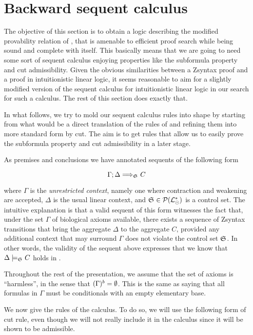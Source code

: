 \section{Backward sequent calculus}

The objective of this section is to obtain a logic describing the modified
provability relation of \eznd{}, that is amenable to efficient proof search
while being sound and complete with \eznd{} itself. This basically means that we
are going to need some sort of sequent calculus enjoying properties like the
subformula property and cut admissibility.  Given the obvious similarities
between a Zsyntax proof and a proof in intuitionistic linear logic, it seems
reasonable to aim for a slightly modified version of the sequent calculus for
intuitionistic linear logic in our search for such a calculus. The rest of this
section does exactly that.

In what follows, we try to mold our sequent calculus rules into shape by
starting from what would be a direct translation of the rules of \eznd{} and
refining them into more standard form by cut. The aim is to get rules that
allow us to easily prove the subformula property and cut admissibility in a
later stage.

As premises and conclusions we have annotated sequents of the following form

\[
  \Gamma ; \Delta \Longrightarrow_{\mathfrak{S}_{}} C
\]

where $\Gamma$ is the \emph{unrestricted context}, namely one where contraction
and weakening are accepted, $\Delta$ is the usual linear context, and
$\mathfrak{S}_{} \in \mathcal{P}(\mathcal{L}_{\odot}^*)$ is a control set. The intuitive
explanation is that a valid sequent of this form witnesses the fact that, under
the set $\Gamma$ of biological axioms available, there exists a sequence of
Zsyntax transitions that bring the aggregate $\Delta$ to the aggregate $C$,
provided any additional context that may surround $\Gamma$ does not violate the
control set $\mathfrak{S}_{}$. In other words, the validity of the sequent above
expresses that we know that $\Delta \models_{\mathfrak{S}_{}} C$ holds in \eznd{}.

Throughout the rest of the presentation, we assume that the set of axioms is
``harmless'', in the sense that $(\Gamma)^{b} = \emptyset$.
This is the same as saying that all formulas in $\Gamma$ must be conditionals
with an empty elementary base.

We now give the rules of the calculus. To do so, we will use the following form
of cut rule, even though we will not really include it in the calculus since it
will be shown to be admissible.

